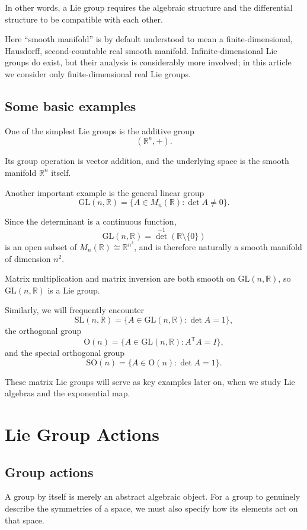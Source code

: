 \documentclass[11pt]{article}
\begin{document}
In other words, a Lie group requires the algebraic structure and the differential structure to be compatible with each other.

Here ``smooth manifold'' is by default understood to mean a finite-dimensional, Hausdorff, second-countable real smooth manifold. Infinite-dimensional Lie groups do exist, but their analysis is considerably more involved; in this article we consider only finite-dimensional real Lie groups.


\subsection{Some basic examples}

One of the simplest Lie groups is the additive group
\[
(\mathbb{R}^n,+).
\]

Its group operation is vector addition, and the underlying space is the smooth manifold $\mathbb{R}^n$ itself.

Another important example is the general linear group
\[
\mathrm{GL}(n,\mathbb{R})
=
\{A\in M_n(\mathbb{R}):\det A\neq 0\}.
\]

Since the determinant is a continuous function,
\[
\mathrm{GL}(n,\mathbb{R})
=
\det^{-1}(\mathbb{R}\setminus\{0\})
\]
is an open subset of $M_n(\mathbb{R})\cong\mathbb{R}^{n^2}$, and is therefore naturally a smooth manifold of dimension $n^2$.

Matrix multiplication and matrix inversion are both smooth on $\mathrm{GL}(n,\mathbb{R})$, so $\mathrm{GL}(n,\mathbb{R})$ is a Lie group.

Similarly, we will frequently encounter
\[
\mathrm{SL}(n,\mathbb{R})
=
\{A\in\mathrm{GL}(n,\mathbb{R}):\det A=1\},
\]
the orthogonal group
\[
\mathrm{O}(n)
=
\{A\in\mathrm{GL}(n,\mathbb{R}):A^{\mathsf T}A=I\},
\]
and the special orthogonal group
\[
\mathrm{SO}(n)
=
\{A\in\mathrm{O}(n):\det A=1\}.
\]

These matrix Lie groups will serve as key examples later on, when we study Lie algebras and the exponential map.


\section{Lie Group Actions}

\subsection{Group actions}

A group by itself is merely an abstract algebraic object. For a group to genuinely describe the symmetries of a space, we must also specify how its elements act on that space.
\end{document}
